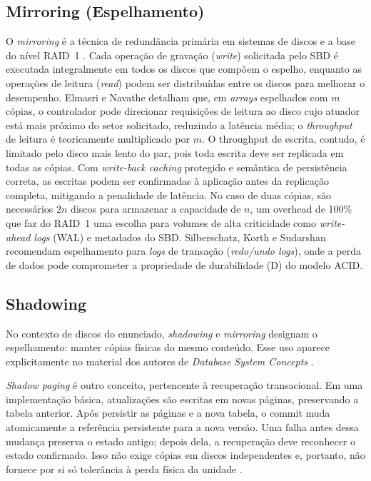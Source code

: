 \documentclass[titlepage]{article}
\begin{document}
\subsection{Mirroring (Espelhamento)}
O \textit{mirroring} é a técnica de redundância primária em sistemas de discos e a base do nível RAID~1 \cite{silberschatz2020}. Cada operação de gravação (\textit{write}) solicitada pelo SBD é executada integralmente em todos os discos que compõem o espelho, enquanto as operações de leitura (\textit{read}) podem ser distribuídas entre os discos para melhorar o desempenho. Elmasri e Navathe \cite{elmasri2016} detalham que, em \textit{arrays} espelhados com $m$ cópias, o controlador pode direcionar requisições de leitura ao disco cujo atuador está mais próximo do setor solicitado, reduzindo a latência média; o \textit{throughput} de leitura é teoricamente multiplicado por $m$. O throughput de escrita, contudo, é limitado pelo disco mais lento do par, pois toda escrita deve ser replicada em todas as cópias. Com \textit{write-back caching} protegido e semântica de persistência correta, as escritas podem ser confirmadas à aplicação antes da replicação completa, mitigando a penalidade de latência. No caso de duas cópias, são necessários $2n$ discos para armazenar a capacidade de $n$, um overhead de 100\% que faz do RAID~1 uma escolha para volumes de alta criticidade como \textit{write-ahead logs} (WAL) e metadados do SBD. Silberschatz, Korth e Sudarshan \cite{silberschatz2020} recomendam espelhamento para \textit{logs} de transação (\textit{redo/undo logs}), onde a perda de dados pode comprometer a propriedade de durabilidade (D) do modelo ACID.

\subsection{Shadowing}
No contexto de discos do enunciado, \textit{shadowing} e \textit{mirroring} designam o espelhamento: manter cópias físicas do mesmo conteúdo. Esse uso aparece explicitamente no material dos autores de \textit{Database System Concepts} \cite{dbbook_storage}.

\textit{Shadow paging} é outro conceito, pertencente à recuperação transacional. Em uma implementação básica, atualizações são escritas em novas páginas, preservando a tabela anterior. Após persistir as páginas e a nova tabela, o commit muda atomicamente a referência persistente para a nova versão. Uma falha antes dessa mudança preserva o estado antigo; depois dela, a recuperação deve reconhecer o estado confirmado. Isso não exige cópias em discos independentes e, portanto, não fornece por si só tolerância à perda física da unidade \cite{elmasri2016}.
\end{document}
